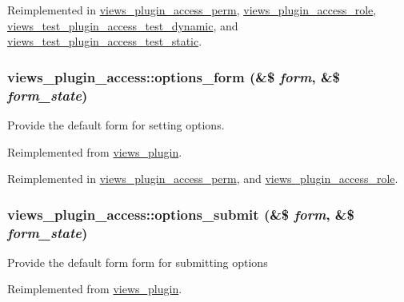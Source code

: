 Reimplemented in \hyperlink{classviews__plugin__access__perm_a7fb275a2bd4c2858064b8d4120ad8f22}{views\_\-plugin\_\-access\_\-perm}, \hyperlink{classviews__plugin__access__role_a76714a96150c4611683068a50be7eb26}{views\_\-plugin\_\-access\_\-role}, \hyperlink{classviews__test__plugin__access__test__dynamic_a93811dcacbb91508644cf989d53ca5cb}{views\_\-test\_\-plugin\_\-access\_\-test\_\-dynamic}, and \hyperlink{classviews__test__plugin__access__test__static_a5b36ae87f1e4d92e04d02bb946a15330}{views\_\-test\_\-plugin\_\-access\_\-test\_\-static}.\hypertarget{classviews__plugin__access_a530865442ea42db5e720e6c49f3d16f2}{
\subsubsection[{options\_\-form}]{\setlength{\rightskip}{0pt plus 5cm}views\_\-plugin\_\-access::options\_\-form (\&\$ {\em form}, \/  \&\$ {\em form\_\-state})}}
\label{classviews__plugin__access_a530865442ea42db5e720e6c49f3d16f2}
Provide the default form for setting options. 

Reimplemented from \hyperlink{classviews__plugin_a1aaed8da1afd9f45293a37358c159837}{views\_\-plugin}.

Reimplemented in \hyperlink{classviews__plugin__access__perm_af662e29c6b61b1a476b7b9ba368f5650}{views\_\-plugin\_\-access\_\-perm}, and \hyperlink{classviews__plugin__access__role_a76293d33e84a78e2ce0df6df955da760}{views\_\-plugin\_\-access\_\-role}.\hypertarget{classviews__plugin__access_ad0610dfaa0e225c5d2cd85c7a13287fd}{
\subsubsection[{options\_\-submit}]{\setlength{\rightskip}{0pt plus 5cm}views\_\-plugin\_\-access::options\_\-submit (\&\$ {\em form}, \/  \&\$ {\em form\_\-state})}}
\label{classviews__plugin__access_ad0610dfaa0e225c5d2cd85c7a13287fd}
Provide the default form form for submitting options 

Reimplemented from \hyperlink{classviews__plugin_a442b0f392deb52725ec8159e05654e06}{views\_\-plugin}.

